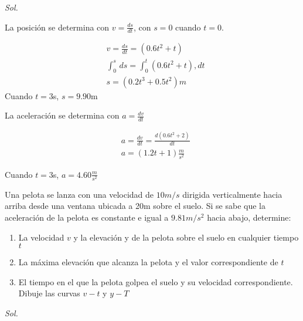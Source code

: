 \textit{ Sol. }

La posición se determina con $v=\frac{ds}{dt}$, con $s=0$ cuando $t=0$. 

\begin{align*}
    &v=\frac{ds}{dt}=\left(0.6t^2+t\right)\\ 
    &\int_0^s\, ds=\int_0^t\left(0.6t^2+t\right), dt\\
    &s=\left(0.2t^3+0.5t^2\right)m
\end{align*}
Cuando $t=3$s, $s=9.90$m 

La aceleración se determina con $a=\frac{dv}{dt}$

\begin{align*}
    &a=\frac{dv}{dt}=\frac{d\left(0.6t^2+2\right)}{dt}\\ 
    &a=\left(1.2t+1\right)\frac{m}{s^2}
\end{align*}

Cuando $t=3$s, $a=4.60\frac{m}{s^2}$


\begin{example}
    Una pelota se lanza con una velocidad de $10m/s$ dirigida verticalmente hacia arriba desde una ventana ubicada a 20m sobre el suelo. Si se sabe que la aceleración de la pelota es constante e igual a $9.81 m/s^2$ hacia abajo, determine: 
    \begin{enumerate}
        \item La velocidad $v$ y la elevación y de la pelota sobre el suelo en cualquier tiempo $t$ 
        \item La máxima elevación que alcanza la pelota y el valor correspondiente de $t$ 
        \item El tiempo en el que la pelota golpea el suelo y su velocidad correspondiente. Dibuje las curvas $v-t$ y $y-T$
    \end{enumerate}
\end{example}

\textit{ Sol. }

